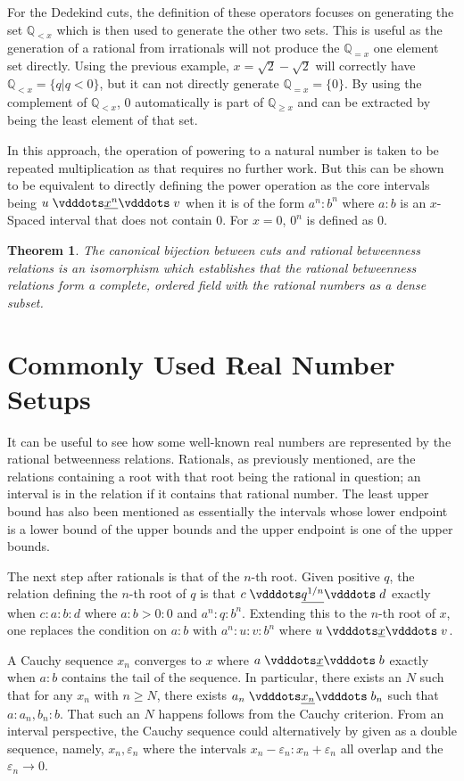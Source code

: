 \documentclass[12pt]{article}
\newtheorem{theorem}{Theorem}[section]
\newcommand{\qcut}[2][x]{\ensuremath{\mathbb{Q}_{#2 #1}}}
\newcommand{\qlt}[1][x]{\qcut[#1]{<}}
\newcommand{\qeq}[1][x]{\qcut[#1]{=}}
\newcommand{\qgeq}[1][x]{\qcut[#1]{\geq}}
\begin{document}
For the Dedekind cuts, the definition of these operators focuses on generating the set $\qlt$ which is then used to generate the other two sets. This is useful as the generation of a rational from irrationals will not produce the $\qeq$ one element set directly. Using the previous example, $ x = \sqrt{2} - \sqrt{2}$ will correctly have $\qlt = \{ q | q < 0\}$, but it can not directly generate $\qeq = \{0\}$. By using the complement of $\qlt$, 0 automatically is part of $\qgeq$ and can be extracted by being the least element of that set.

In this approach, the operation of powering to a natural number is taken to be repeated multiplication as that requires no further work. But this can be shown to be equivalent to directly defining the power operation as the core intervals being $u \xrel[x^n] v$ when it is of the form $a^n: b^n$ where $a:b$ is an $x$-Spaced interval that does not contain 0. For $x = 0$, $0^n$ is defined as $0$. 


\begin{theorem}
The canonical bijection between cuts and rational betweenness relations is an isomorphism which establishes that the rational betweenness relations form a complete, ordered field with the rational numbers as a dense subset. 
\end{theorem}

\section{Commonly Used Real Number Setups}

It can be useful to see how some well-known real numbers are represented by the rational betweenness relations. Rationals, as previously mentioned, are the relations containing a root with that root being the rational in question; an interval is in the relation if it contains that rational number. The least upper bound has also been mentioned as essentially the intervals whose lower endpoint is a lower bound of the upper bounds and the upper endpoint is one of the upper bounds. 

The next step after rationals is that of the $n$-th root. Given positive $q$, the relation defining the $n$-th root of $q$ is that $c \xrel[q^{1/n}] d$ exactly when $c:a:b:d$ where $a:b > 0:0$ and  $a^n: q: b^n$. Extending this to the $n$-th root of $x$, one replaces the condition on $a:b$ with $a^n:u:v:b^n$ where $u \xrel v$. 

A Cauchy sequence $x_n$ converges to $x$ where $a \xrel b$ exactly when $a:b$ contains the tail of the sequence. In particular, there exists an $N$ such that for any $x_n$ with $n \geq N$, there exists $a_n \xrel[x_n] b_n$ such that $a:{a_n, b_n}:b$. That such an $N$ happens follows from the Cauchy criterion. From an interval perspective, the Cauchy sequence could alternatively by given as a double sequence, namely, $x_n, \varepsilon_n$ where the intervals $x_n-\varepsilon_n : x_n + \varepsilon_n$  all overlap and the $\varepsilon_n \to 0$. 
\end{document}
